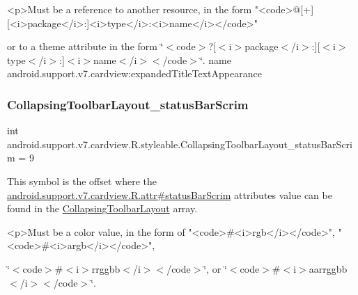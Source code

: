 \begin{DoxyVerb}      <p>Must be a reference to another resource, in the form "<code>@[+][<i>package</i>:]<i>type</i>:<i>name</i></code>"
\end{DoxyVerb}
 or to a theme attribute in the form \char`\"{}$<$code$>$?\mbox{[}$<$i$>$package$<$/i$>$\+:\mbox{]}\mbox{[}$<$i$>$type$<$/i$>$\+:\mbox{]}$<$i$>$name$<$/i$>$$<$/code$>$\char`\"{}.  name android.\+support.\+v7.\+cardview\+:expanded\+Title\+Text\+Appearance \mbox{\label{classandroid_1_1support_1_1v7_1_1cardview_1_1R_1_1styleable_ac95b8a59eb9582467255c194e9d8546c}} 
\subsubsection{\texorpdfstring{Collapsing\+Toolbar\+Layout\+\_\+status\+Bar\+Scrim}{CollapsingToolbarLayout\_statusBarScrim}}
{\footnotesize\ttfamily int android.\+support.\+v7.\+cardview.\+R.\+styleable.\+Collapsing\+Toolbar\+Layout\+\_\+status\+Bar\+Scrim = 9\hspace{0.3cm}{\ttfamily [static]}}

This symbol is the offset where the \hyperlink{classandroid_1_1support_1_1v7_1_1cardview_1_1R_1_1attr_a0eaa00e33bfe549c91d9e06f97e36f72}{android.\+support.\+v7.\+cardview.\+R.\+attr\#status\+Bar\+Scrim} attribute\textquotesingle{}s value can be found in the \hyperlink{classandroid_1_1support_1_1v7_1_1cardview_1_1R_1_1styleable_a3b4c5393d0c99cb4e5a7a3911fc606b4}{Collapsing\+Toolbar\+Layout} array.

\begin{DoxyVerb}      <p>Must be a color value, in the form of "<code>#<i>rgb</i></code>", "<code>#<i>argb</i></code>",
\end{DoxyVerb}
 \char`\"{}$<$code$>$\#$<$i$>$rrggbb$<$/i$>$$<$/code$>$\char`\"{}, or \char`\"{}$<$code$>$\#$<$i$>$aarrggbb$<$/i$>$$<$/code$>$\char`\"{}. 

